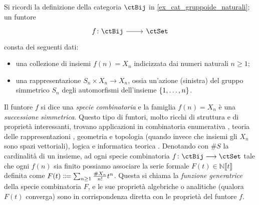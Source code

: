 \begin{example}\label{ex_fun_specie}
 Si ricordi la definizione della categoria \(\ctBij\) in \ref{ex_cat_gruppoide_naturali}; un funtore
 \[\dmFun{f}{\ctBij}{\ctSet}\]
 consta dei seguenti dati:
 \begin{itemize}
  \item una collezione di insiemi \(f(n)=X_n\) indicizzata dai numeri naturali \(n\ge 1\);
  \item una rappresentazione \(S_n \times X_n\to X_n\), ossia un'azione (sinistra) del gruppo simmetrico \(S_n\) degli automorfismi dell'insieme \(\{\iter n\}\).
 \end{itemize}
 Il funtore \(f\) si dice una \emph{specie combinatoria} e la famiglia \(f(n)=X_n\) è una \emph{successione simmetrica}. Questo tipo di funtori, molto ricchi di struttura e di proprietà interessanti, trovano applicazioni in combinatoria enumerativa \cite{bergeron1998combinatorial}, teoria delle rappresentazioni \cite{aguiar2010monoidal}, geometria e topologia \cite{fresse-operads} (quando invece che insiemi gli \(X_n\) sono spazi vettoriali), logica e informatica teorica \cite{Gambino2017,Hasegawa2002}. Denotando con \(\# S\) la cardinalità di un insieme, ad ogni specie combinatoria \(f \colon \ctBij \fun\ctSet\) tale che ogni \(f(n)\) sia finito possiamo associare la serie formale \(F(t)\in\mathbb{N}\llbracket t\rrbracket\) definita come \(F(t) \defeq \sum_{n\ge 1} \frac{\# X_n}{n!}t^n\). Questa si chiama la \emph{funzione generatrice} della specie combinatoria \(F\), e le sue proprietà algebriche o analitiche (qualora \(F(t)\) converga) sono in corrispondenza diretta con le proprietà del funtore \(f\).
\end{example}
